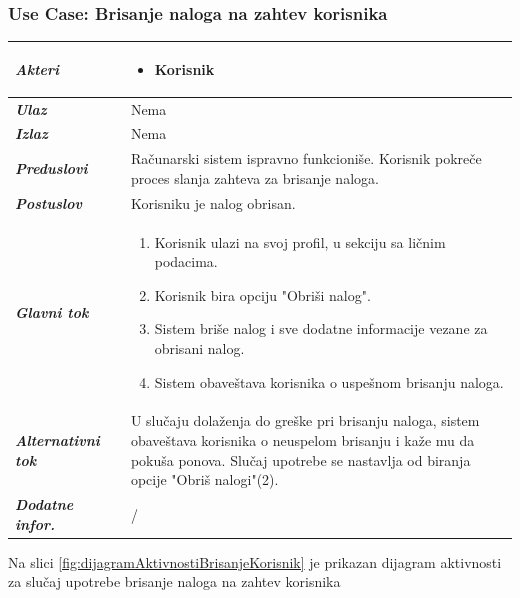 \documentclass[20pt]{article}
\begin{document}
\subsubsection{\bfseries\large Use Case: Brisanje naloga na zahtev korisnika}
\begin{center}
\begin{tabular}{p{0.23\linewidth} p{0.77\linewidth}}
 \hline
 {\it \bfseries Akteri} & \begin{itemize}
    \item Korisnik
\end{itemize}\\
\hline

 {\it \bfseries Ulaz} & Nema\\
 \hline
 
 {\it \bfseries Izlaz} & Nema\\
 \hline
 
 {\it \bfseries Preduslovi} & Ra\v {c}unarski sistem ispravno funkcioni\v {s}e. Korisnik pokre\v {c}e proces slanja zahteva za brisanje naloga.\\
 \hline
 
 {\it \bfseries Postuslov} & Korisniku je nalog obrisan.\\
 \hline

     {\it \bfseries Glavni tok} &  
     \begin{enumerate}
         \item Korisnik ulazi na svoj profil, u sekciju sa li\v {c}nim podacima.
         \item Korisnik bira opciju "Obri\v {s}i nalog".
         \item Sistem bri\v {s}e nalog i sve dodatne informacije vezane za obrisani nalog.
         \item Sistem obave\v {s}tava korisnika o uspe\v {s}nom brisanju naloga.
    \end{enumerate}\\
 \hline
 {\it \bfseries Alternativni tok} & U slu\v {c}aju dola\v {z}enja do gre\v {s}ke pri brisanju naloga, sistem obave\v {s}tava korisnika o neuspelom brisanju i ka\v {z}e mu da poku\v {s}a ponova. Slu\v {c}aj upotrebe se nastavlja od biranja opcije "Obri\v {s} nalogi"(2).\\
 \hline
 {\it \bfseries Dodatne infor.} & /\\
 \hline


\end{tabular}
\end{center}
\newpage
{}
\setlength{\parindent}{1cm}
\fontsize{13}{18} \selectfont 
Na slici \ref{fig:dijagramAktivnostiBrisanjeKorisnik} je prikazan dijagram aktivnosti za slu\v{c}aj upotrebe brisanje naloga na zahtev korisnika
\end{document}
